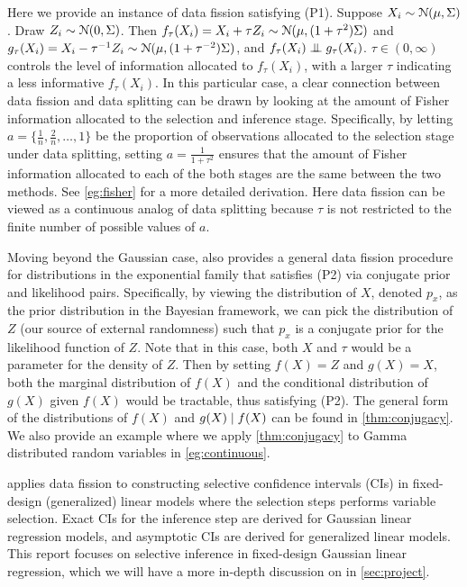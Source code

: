 Here we provide an instance of data fission satisfying (P1). Suppose $X_i\sim \mathcal{N}(\mu, \Sigma)$. Draw $Z_i\sim\mathcal{N}(0,\Sigma)$. Then $f_\tau(X_i) = X_i + \tau Z_i \sim \mathcal{N}(\mu, (1+\tau^2)\Sigma)$ and $g_\tau(X_i) = X_i-\tau^{-1}Z_i \sim \mathcal{N}(\mu, (1+\tau^{-2})\Sigma)$, and $f_\tau(X_i) \indep g_\tau(X_i)$. $\tau\in(0,\infty)$ controls the level of information allocated to $f_\tau(X_i)$, with a larger $\tau$ indicating a less informative $f_\tau(X_i)$. In this particular case, a clear connection between data fission and data splitting can be drawn by looking at the amount of Fisher information allocated to the selection and inference stage. Specifically, by letting $a=\{\frac{1}{n}, \frac{2}{n}, \dots, 1\}$ be the proportion of observations allocated to the selection stage under data splitting, setting $a=\frac{1}{1+\tau^2}$ ensures that the amount of Fisher information allocated to each of the both stages are the same between the two methods. See \cref{eg:fisher} for a more detailed derivation. Here data fission can be viewed as a continuous analog of data splitting because $\tau$ is not restricted to the finite number of possible values of $a$.

Moving beyond the Gaussian case, \cite{leiner2022data} also provides a general data fission procedure for distributions in the exponential family that satisfies (P2) via conjugate prior and likelihood pairs. Specifically, by viewing the distribution of $X$, denoted $p_x$, as the prior distribution in the Bayesian framework, we can pick the distribution of $Z$ (our source of external randomness) such that $p_x$ is a conjugate prior for the likelihood function of $Z$. Note that in this case, both $X$ and $\tau$ would be a parameter for the density of $Z$. Then by setting $f(X)=Z$ and $g(X)=X$, both the marginal distribution of $f(X)$ and the conditional distribution of $g(X)$ given $f(X)$ would be tractable, thus satisfying (P2). The general form of the distributions of $f(X)$ and $g(X)\mid f(X)$ can be found in \cref{thm:conjugacy}. We also provide an example where we apply \cref{thm:conjugacy} to Gamma distributed random variables in \cref{eg:continuous}.

\cite{leiner2022data} applies data fission to constructing selective confidence intervals (CIs) in fixed-design (generalized) linear models where the selection steps performs variable selection. Exact CIs for the inference step are derived for Gaussian linear regression models, and asymptotic CIs are derived for generalized linear models. This report focuses on selective inference in fixed-design Gaussian linear regression, which we will have a more in-depth discussion on in \cref{sec:project}.